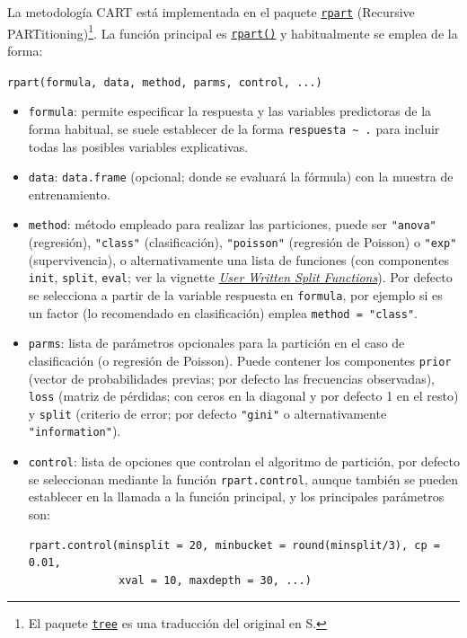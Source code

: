 \documentclass[
]{book}
\theoremstyle{break}
\theoremstyle{nonumberplain}
\begin{document}
La metodología CART está implementada en el paquete \href{https://CRAN.R-project.org/package=rpart}{\texttt{rpart}}
(Recursive PARTitioning)\footnote{El paquete \href{https://CRAN.R-project.org/package=tree}{\texttt{tree}} es una traducción del original en S.}.
La función principal es \href{https://rdrr.io/pkg/rpart/man/rpart.html}{\texttt{rpart()}} y habitualmente se emplea de la forma:

\texttt{rpart(formula,\ data,\ method,\ parms,\ control,\ ...)}

\begin{itemize}
\item
  \texttt{formula}: permite especificar la respuesta y las variables predictoras de la forma habitual,
  se suele establecer de la forma \texttt{respuesta\ \textasciitilde{}\ .} para incluir todas las posibles variables explicativas.
\item
  \texttt{data}: \texttt{data.frame} (opcional; donde se evaluará la fórmula) con la muestra de entrenamiento.
\item
  \texttt{method}: método empleado para realizar las particiones, puede ser \texttt{"anova"} (regresión), \texttt{"class"} (clasificación),
  \texttt{"poisson"} (regresión de Poisson) o \texttt{"exp"} (supervivencia), o alternativamente una lista de funciones (con componentes
  \texttt{init}, \texttt{split}, \texttt{eval}; ver la vignette \href{https://cran.r-project.org/web/packages/rpart/vignettes/usercode.pdf}{\emph{User Written Split Functions}}).
  Por defecto se selecciona a partir de la variable respuesta en \texttt{formula},
  por ejemplo si es un factor (lo recomendado en clasificación) emplea \texttt{method\ =\ "class"}.
\item
  \texttt{parms}: lista de parámetros opcionales para la partición en el caso de clasificación
  (o regresión de Poisson). Puede contener los componentes \texttt{prior} (vector de probabilidades previas;
  por defecto las frecuencias observadas), \texttt{loss} (matriz de pérdidas; con ceros en la diagonal y por defecto 1 en el resto)
  y \texttt{split} (criterio de error; por defecto \texttt{"gini"} o alternativamente \texttt{"information"}).
\item
  \texttt{control}: lista de opciones que controlan el algoritmo de partición, por defecto se seleccionan mediante la función \texttt{rpart.control},
  aunque también se pueden establecer en la llamada a la función principal, y los principales parámetros son:

\begin{verbatim}
rpart.control(minsplit = 20, minbucket = round(minsplit/3), cp = 0.01, 
              xval = 10, maxdepth = 30, ...)
\end{verbatim}


\end{itemize}
\end{document}
